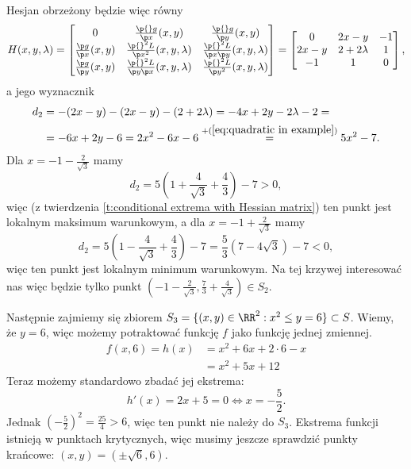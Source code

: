 \begin{solution}
    Hesjan obrzeżony będzie więc równy
    \[ H(x, y, \lambda) = \begin{bmatrix}
        0 & \frac{\p{} g}{\p x}(x, y) & \frac{\p{} g}{\p y}(x, y) \\
        \frac{\p g}{\p x}(x, y) & \frac{\p{}^2 L}{\p x^2}(x, y, \lambda) & \frac{\p{}^2 L}{\p x \p y}(x, y, \lambda) \\
        \frac{\p g}{\p y}(x, y) & \frac{\p{}^2 L}{\p y \p x}(x, y, \lambda) & \frac{\p{}^2 L}{\p y^2}(x, y, \lambda)
    \end{bmatrix} = \begin{bmatrix}
        0 & 2x - y & -1 \\
        2x - y & 2 + 2\lambda & 1 \\
        -1 & 1 & 0
    \end{bmatrix}, \]
    a jego wyznacznik
    \begin{align*}
        d_2 &= -(2x -y) - (2x - y) - (2 + 2\lambda) = -4x + 2y - 2\lambda - 2 = \\
        &= -6x + 2y - 6 = 2x^2 - 6x - 6 \stackrel{+(\ref{eq:quadratic in example})}{=} 5x^2 - 7.
    \end{align*}
    Dla $x = -1 - \frac{2}{\sqrt{3}}$ mamy
    \[ d_2 = 5\left(1 + \frac{4}{\sqrt{3}} + \frac{4}{3}\right) - 7 > 0, \]
    więc (z twierdzenia \ref{t:conditional extrema with Hessian matrix}) ten punkt jest lokalnym maksimum warunkowym, a dla $x = -1 + \frac{2}{\sqrt{3}}$ mamy
    \[ d_2 = 5\left(1 - \frac{4}{\sqrt{3}} + \frac{4}{3}\right) - 7 = \frac{5}{3}\left(7-4\sqrt{3}\right) - 7 < 0, \]
    więc ten punkt jest lokalnym minimum warunkowym. Na tej krzywej interesować nas więc będzie tylko punkt $\left(-1-\frac{2}{\sqrt{3}}, \frac{7}{3} + \frac{4}{\sqrt{3}}\right) \in S_2$.

    Następnie zajmiemy się zbiorem $S_3 = \{(x, y) \in \RR^2 : x^2 \leq y = 6\} \subset S$. Wiemy, że $y = 6$, więc możemy potraktować funkcję $f$ jako funkcję jednej zmiennej.
    \begin{align*} f(x, 6) = h(x) &= x^2 + 6x + 2\cdot 6 - x \\
                                  &= x^2 + 5x + 12 \end{align*}
    Teraz możemy standardowo zbadać jej ekstrema:
    \[ h'(x) = 2x + 5 = 0 \iff x = -\frac{5}{2}. \]
    Jednak $\left(-\frac{5}{2}\right)^2 = \frac{25}{4} > 6$, więc ten punkt nie należy do $S_3$. Ekstrema funkcji istnieją w punktach krytycznych, więc musimy jeszcze sprawdzić punkty krańcowe: $(x, y) = (\pm\sqrt{6}, 6)$.


\end{solution}
